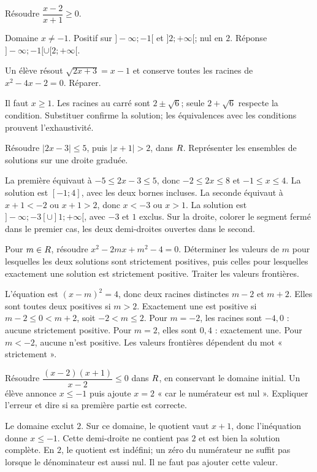 \exo[Quotient]\label{t11s-c08-e07}
Résoudre $\dfrac{x-2}{x+1}\ge0$.
\begin{corrige}\label{sol-t11s-c08-e07}
Domaine $x\ne-1$. Positif sur $]-\infty;-1[$ et $]2;+\infty[$; nul en $2$. Réponse $]-\infty;-1[\cup[2;+\infty[$.
\end{corrige}
\label{t11s-c08-e08}
Un élève résout $\sqrt{2x+3}=x-1$ et conserve toutes les racines de $x^2-4x-2=0$. Réparer.
\begin{corrige}\label{sol-t11s-c08-e08}
Il faut $x\ge1$. Les racines au carré sont $2\pm\sqrt6$; seule $2+\sqrt6$ respecte la condition. Substituer confirme la solution; les équivalences avec les conditions prouvent l’exhaustivité.
\end{corrige}
\label{t11s-c08-e09}
Résoudre $|2x-3|\le5$, puis $|x+1|>2$, dans $R$. Représenter les ensembles de solutions sur une droite graduée.
\begin{corrige}\label{sol-t11s-c08-e09}
La première équivaut à $-5\le2x-3\le5$, donc $-2\le2x\le8$ et $-1\le x\le4$. La solution est $[-1;4]$, avec les deux bornes incluses. La seconde équivaut à $x+1<-2$ ou $x+1>2$, donc $x<-3$ ou $x>1$. La solution est $]-\infty;-3[\cup]1;+\infty[$, avec $-3$ et $1$ exclus. Sur la droite, colorer le segment fermé dans le premier cas, les deux demi-droites ouvertes dans le second.
\end{corrige}

\label{t11s-c08-p01}
Pour $m\in R$, résoudre $x^2-2mx+m^2-4=0$. Déterminer les valeurs de $m$ pour lesquelles les deux solutions sont strictement positives, puis celles pour lesquelles exactement une solution est strictement positive. Traiter les valeurs frontières.
\begin{corrige}\label{sol-t11s-c08-p01}
L’équation est $(x-m)^2=4$, donc deux racines distinctes $m-2$ et $m+2$. Elles sont toutes deux positives si $m>2$. Exactement une est positive si $m-2\le0<m+2$, soit $-2<m\le2$. Pour $m=-2$, les racines sont $-4,0$ : aucune strictement positive. Pour $m=2$, elles sont $0,4$ : exactement une. Pour $m<-2$, aucune n’est positive. Les valeurs frontières dépendent du mot « strictement ».
\end{corrige}
\label{t11s-c08-p02}
Résoudre $\dfrac{(x-2)(x+1)}{x-2}\le0$ dans $R$, en conservant le domaine initial. Un élève annonce $x\le-1$ puis ajoute $x=2$ « car le numérateur est nul ». Expliquer l’erreur et dire si sa première partie est correcte.
\begin{corrige}\label{sol-t11s-c08-p02}
Le domaine exclut $2$. Sur ce domaine, le quotient vaut $x+1$, donc l’inéquation donne $x\le-1$. Cette demi-droite ne contient pas $2$ et est bien la solution complète. En $2$, le quotient est indéfini; un zéro du numérateur ne suffit pas lorsque le dénominateur est aussi nul. Il ne faut pas ajouter cette valeur.
\end{corrige}


